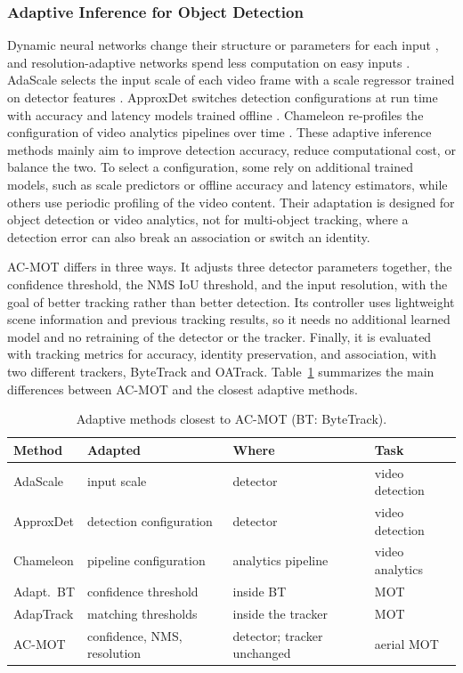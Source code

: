 \documentclass[pdflatex,sn-mathphys-num,iicol]{sn-jnl}
\begin{document}
\subsubsection{Adaptive Inference for Object Detection}
Dynamic neural networks change their structure or parameters for each input
\cite{han2022dynamic}, and resolution-adaptive networks spend less computation
on easy inputs \cite{yang2020ranet}. AdaScale selects the input scale of each
video frame with a scale regressor trained on detector features
\cite{chin2019adascale}. ApproxDet switches detection configurations at run
time with accuracy and latency models trained offline \cite{xu2020approxdet}.
Chameleon re-profiles the configuration of video analytics pipelines over time
\cite{jiang2018chameleon}. These adaptive inference methods mainly aim to improve detection accuracy, reduce computational cost, or balance the two. To select a configuration, some rely on additional trained models, such as scale predictors or offline accuracy and latency estimators, while others use periodic profiling of the video content. Their adaptation is designed for object detection or video analytics, not for multi-object tracking, where a detection error can also break an association or switch an identity.

AC-MOT differs in three ways. It adjusts three detector parameters together, the confidence threshold, the NMS IoU threshold, and the input resolution, with the goal of better tracking rather than better detection. Its controller uses lightweight scene information and previous tracking results, so it needs no additional learned model and no retraining of the detector or the tracker. Finally, it is evaluated with tracking metrics for accuracy, identity preservation, and association, with two different trackers, ByteTrack and OATrack. Table~\ref{tab:related} summarizes the main differences between AC-MOT and the closest adaptive methods.

\begin{table}[t]
\caption{Adaptive methods closest to AC-MOT (BT: ByteTrack).}
\label{tab:related}
\centering\footnotesize
\setlength{\tabcolsep}{3pt}
\begin{tabular}{@{}l>{\raggedright\arraybackslash}p{20mm}>{\raggedright\arraybackslash}p{17mm}>{\raggedright\arraybackslash}p{13mm}@{}}
\toprule
Method & Adapted & Where & Task\\
\midrule
AdaScale \cite{chin2019adascale} & input scale & detector & video detection\\
ApproxDet \cite{xu2020approxdet} & detection configuration & detector & video detection\\
Chameleon \cite{jiang2018chameleon} & pipeline configuration & analytics pipeline & video analytics\\
Adapt.\ BT \cite{ma2023adaptivebytetrack} & confidence threshold & inside BT & MOT\\
AdapTrack \cite{shim2024adaptrack} & matching thresholds & inside the tracker & MOT\\
AC-MOT & confidence, NMS, resolution & detector; tracker unchanged & aerial MOT\\
\bottomrule
\end{tabular}
\end{table}
\end{document}
